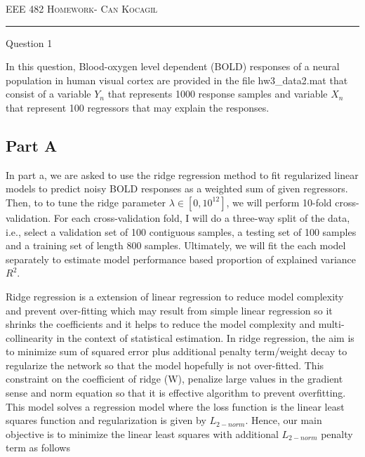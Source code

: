 \documentclass[12pt]{amsart}
\makeatletter
\def\section{\@startsection{section}{1}%
  \z@{.7\linespacing\@plus\linespacing}{.5\linespacing}%
  {\normalfont\scshape}}%
\makeatother
\begin{document}

\newpage
{\scshape EEE 482} \hfill {\scshape \large  Homework-\relax} \hfill {\scshape Can Kocagil}
\smallskip
\hrule
\vspace{2mm}


\section{Question 1}

In this question, Blood-oxygen level dependent (BOLD) responses of a neural population in human visual
cortex are provided in the file hw3\_data2.mat that consist of a variable $Y_n$ that represents
1000 response samples and variable $X_n$ that represent 100 regressors that may explain the responses.


\subsection{Part A}

In part a, we are asked to use the ridge regression method to fit regularized linear models to predict noisy BOLD
responses as a weighted sum of given regressors. Then, to to tune the ridge parameter $\lambda \in [0,10^{12}]$, we will perform 10-fold cross-validation. For each cross-validation fold, I will do a three-way split of the data, i.e.,  select a validation set of 100 contiguous samples, a testing set of 100 samples and a training set of length 800 samples. Ultimately, we will fit the each model separately to estimate model performance based proportion of explained variance $R^2$.

\bigskip

Ridge regression is a extension of linear regression to reduce model complexity and prevent over-fitting which may result from simple linear regression so it shrinks the coefficients and it helps to reduce the model complexity and multi-collinearity in the context of statistical estimation. In ridge regression, the aim is to minimize sum of squared error plus additional penalty term/weight decay to regularize the network so that the model hopefully is not over-fitted. This constraint on the coefficient of ridge (W), penalize large values in the gradient sense and norm equation so that it is effective algorithm to prevent overfitting. This model solves a regression model where the loss function is the linear least squares function and regularization is given by  $L_{2-norm}$. Hence, our main objective is to minimize the linear least squares with additional $L_{2-norm}$ penalty term as follows
\end{document}

